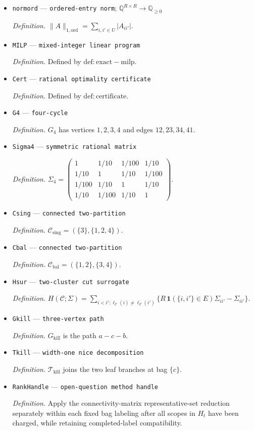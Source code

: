\documentclass{article}
\begin{document}
\begin{itemize}
  \item \texttt{normord} --- \texttt{ordered-\allowbreak{}entry norm}; \(\mathbb Q^{R\times R}\to\mathbb Q_{\ge0}\)
  \par\smallskip\noindent\emph{Definition.} \(\|A\|_{1,\mathrm{ord}}=\sum_{i,i'\in U}|A_{ii'}|\).
  \item \texttt{MILP} --- \texttt{mixed-\allowbreak{}integer linear program}
  \par\smallskip\noindent\emph{Definition.} Defined by \(\mathrm{def:exact-milp}\).
  \item \texttt{Cert} --- \texttt{rational optimality certificate}
  \par\smallskip\noindent\emph{Definition.} Defined by \(\mathrm{def:certificate}\).
  \item \texttt{G4} --- \texttt{four-\allowbreak{}cycle}
  \par\smallskip\noindent\emph{Definition.} \(G_4\) has vertices \(1,2,3,4\) and edges \(12,23,34,41\).
  \item \texttt{Sigma4} --- \texttt{symmetric rational matrix}
  \par\smallskip\noindent\emph{Definition.} \(\Sigma_4=\begin{pmatrix}1&1/10&1/100&1/10\\1/10&1&1/10&1/100\\1/100&1/10&1&1/10\\1/10&1/100&1/10&1\end{pmatrix}\).
  \item \texttt{Csing} --- \texttt{connected two-\allowbreak{}partition}
  \par\smallskip\noindent\emph{Definition.} \(\mathcal C_{\mathrm{sing}}=(\{3\},\{1,2,4\})\).
  \item \texttt{Cbal} --- \texttt{connected two-\allowbreak{}partition}
  \par\smallskip\noindent\emph{Definition.} \(\mathcal C_{\mathrm{bal}}=(\{1,2\},\{3,4\})\).
  \item \texttt{Hsur} --- \texttt{two-\allowbreak{}cluster cut surrogate}
  \par\smallskip\noindent\emph{Definition.} \(H(\mathcal C;\Sigma)=\sum_{i<i':\ell_{\mathcal C}(i)\ne\ell_{\mathcal C}(i')}\{R\,\mathbf 1(\{i,i'\}\in E)\Sigma_{ii'}-\Sigma_{ii'}\}\).
  \item \texttt{Gkill} --- \texttt{three-\allowbreak{}vertex path}
  \par\smallskip\noindent\emph{Definition.} \(G_{\mathrm{kill}}\) is the path \(a-c-b\).
  \item \texttt{Tkill} --- \texttt{width-\allowbreak{}one nice decomposition}
  \par\smallskip\noindent\emph{Definition.} \(\mathcal T_{\mathrm{kill}}\) joins the two leaf branches at bag \(\{c\}\).
  \item \texttt{RankHandle} --- \texttt{open-\allowbreak{}question method handle}
  \par\smallskip\noindent\emph{Definition.} Apply the connectivity-matrix representative-set reduction separately within each fixed bag labeling after all scopes in \(H_t\) have been charged, while retaining completed-label compatibility.
\end{itemize}
\end{document}
